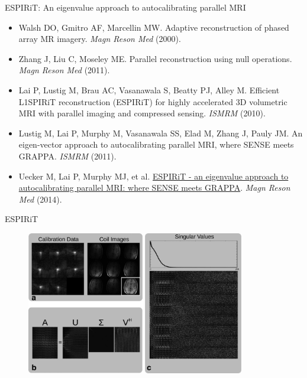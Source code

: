 \documentclass[aspectratio=169]{beamer}
\begin{document}
	\begin{frame}{ESPIRiT: An eigenvalue approach to autocalibrating parallel MRI}
		\begin{itemize}
			\item Walsh DO, Gmitro AF, Marcellin MW. Adaptive reconstruction of phased array MR imagery. \textit{Magn Reson Med} (2000).
			\vspace{1em}
			
			\item Zhang J, Liu C, Moseley ME. Parallel reconstruction using null operations. \textit{Magn Reson Med} (2011).
			\vspace{1em}
			
			\item Lai P, Lustig M, Brau AC, Vasanawala S, Beatty PJ, Alley M. Efficient L1SPIRiT reconstruction (ESPIRiT) for highly accelerated 3D volumetric MRI with parallel imaging and compressed sensing. \textit{ISMRM} (2010).
			\vspace{1em}
			
			\item Lustig M, Lai P, Murphy M, Vasanawala SS, Elad M, Zhang J, Pauly JM. An eigen-vector approach to autocalibrating parallel MRI, where SENSE meets GRAPPA. \textit{ISMRM} (2011).
			\vspace{1em}
			
			\item Uecker M, Lai P, Murphy MJ, et al. \href{https://doi.org/10.1002/mrm.24751}{ESPIRiT - an eigenvalue approach to autocalibrating parallel MRI: where SENSE meets GRAPPA}. \textit{Magn Reson Med} (2014).
		\end{itemize}
	\end{frame}
	
	\begin{frame}{ESPIRiT}
		\begin{figure}
			\centering
			\includegraphics[width=0.85\textwidth]{figures/mrm24751-fig-0002-m.jpg}
		\end{figure}
	\end{frame}
	
\end{document}
